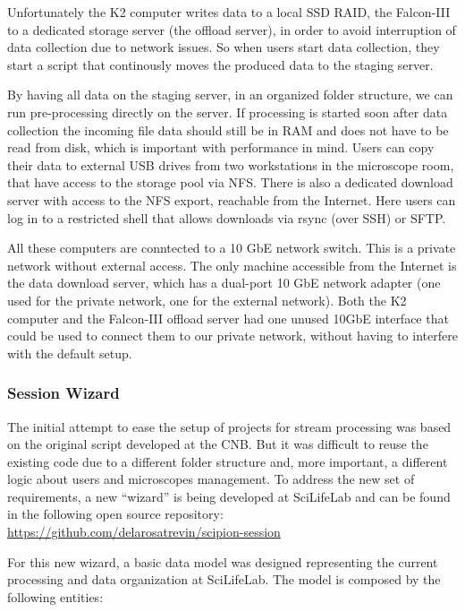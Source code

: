 Unfortunately the K2 computer writes data to a local SSD RAID, the Falcon-III to
a dedicated storage server (the offload server), in order to avoid interruption
of data collection due to network issues. So when users start data collection,
they start a script that continously moves the produced data to the staging
server.

By having all data on the staging server, in an organized folder structure, we
can run pre-processing directly on the server. If processing is started soon
after data collection the incoming file data should still be in RAM and does not
have to be read from disk, which is important with performance in mind. Users
can copy their data to external USB drives from two workstations in the
microscope room, that have access to the storage pool via NFS.
There is also a dedicated download server with access to the NFS export,
reachable from the Internet. Here users can log in to a restricted shell that
allows downloads via rsync (over SSH) or SFTP. 

All these computers are conntected to a 10 GbE network switch. This is a private
network without external access. The only machine accessible from the Internet
is the data download server, which has a dual-port 10 GbE network adapter (one
used for the private network, one for the external network). Both the K2
computer and the Falcon-III offload server had one unused 10GbE interface that
could be used to connect them to our private network, without having to
interfere with the default setup.

\subsubsection{Session Wizard}

The initial attempt to ease the setup of \scipion projects for stream processing was based  
on the original script developed at the CNB. But it was difficult to reuse the existing code due to a different folder
structure and, more important, a different logic about users and microscopes management. To address the new set
of requirements, a new ``wizard'' is being developed at SciLifeLab and can be found in the following open source repository: 
\url{https://github.com/delarosatrevin/scipion-session}

For this new wizard, a basic data model was designed representing the current processing and data 
organization at SciLifeLab. The model is composed by the following entities:

